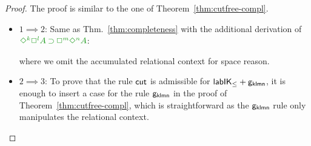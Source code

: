 \begin{proof} 
	The proof is similar to the one of Theorem~\ref{thm:cutfree-compl}.
	\begin{itemize}
		\item $1 \implies 2$:
		Same as Thm.~\ref{thm:completeness} with the additional derivation of $\fm{\DIA^k\BOX^l A \IMP \BOX^m\DIA^n A}$:
		\begin{smallequation*}
		\end{smallequation*}
		where we omit the accumulated relational context for space reason.
		
		\item $2 \implies 3$:
		To prove that the rule $\mathsf{cut}$ is admissible for $\mathsf{lab}\mathsf{IK}_{\le} + {\mathsf{g_{klmn}}}$, it is enough to insert a case for the rule ${\mathsf{g_{klmn}}}$ in the proof of Theorem~\ref{thm:cutfree-compl}, which
		is straightforward as the ${\mathsf{g_{klmn}}}$ rule only manipulates the relational context.
		

\end{itemize}
\end{proof}
